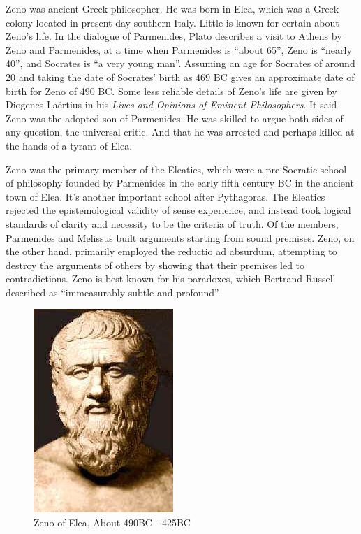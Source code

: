 \documentclass{article}
\begin{document}
Zeno was ancient Greek philosopher. He was born in Elea, which was a Greek colony located in present-day southern Italy. Little is known for certain about Zeno's life. In the dialogue of Parmenides, Plato describes a visit to Athens by Zeno and Parmenides, at a time when Parmenides is ``about 65'', Zeno is ``nearly 40'', and Socrates is ``a very young man''. Assuming an age for Socrates of around 20 and taking the date of Socrates' birth as 469 BC gives an approximate date of birth for Zeno of 490 BC. Some less reliable details of Zeno's life are given by Diogenes Laërtius in his {\em Lives and Opinions of Eminent Philosophers}. It said Zeno was the adopted son of Parmenides. He was skilled to argue both sides of any question, the universal critic. And that he was arrested and perhaps killed at the hands of a tyrant of Elea\cite{HanXueTao16}.

Zeno was the primary member of the Eleatics, which were a pre-Socratic school of philosophy founded by Parmenides in the early fifth century BC in the ancient town of Elea. It's another important school after Pythagoras. The Eleatics rejected the epistemological validity of sense experience, and instead took logical standards of clarity and necessity to be the criteria of truth. Of the members, Parmenides and Melissus built arguments starting from sound premises. Zeno, on the other hand, primarily employed the reductio ad absurdum, attempting to destroy the arguments of others by showing that their premises led to contradictions. Zeno is best known for his paradoxes, which Bertrand Russell described as ``immeasurably subtle and profound''.

\begin{figure}[htbp]
 \centering
 \includegraphics[scale=0.5]{img/Zeno.jpg}
 \captionsetup{labelformat=empty}
 \caption{Zeno of Elea, About 490BC - 425BC}
 \label{fig:Zeno-of-Elea}
\end{figure}
\end{document}
